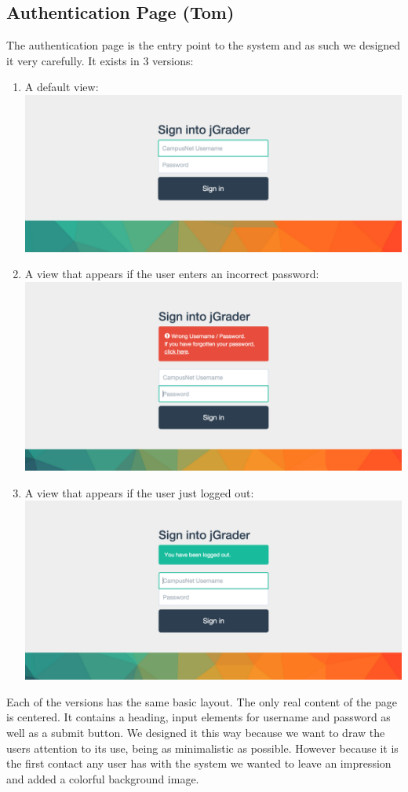 \subsection{Authentication Page (Tom)}

The authentication page is the entry point to the system and as such we designed it very carefully. It exists in 3 versions:
\begin{enumerate}
  \item A default view:
  	\subitem \includegraphics[width=.55\textwidth]{screenshots/SignIn.png}
  \item A view that appears if the user enters an incorrect password: 
   	\subitem \includegraphics[width=.55\textwidth]{screenshots/WrongPW.png}
  \item A view that appears if the user just logged out: 
   	\subitem \includegraphics[width=.55\textwidth]{screenshots/LogOut.png}
\end{enumerate}
\newpage

Each of the versions has the same basic layout. The only real content of the page is centered. It contains a heading, input elements for username and password as well as a submit button. We designed it this way because we want to draw the users attention to its use, being as minimalistic as possible. However because it is the first contact any user has with the system we wanted to leave an impression and added a colorful background image.

